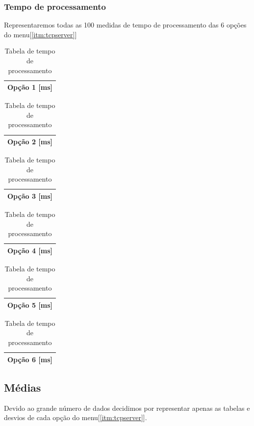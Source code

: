\documentclass[a4paper,10pt]{article}
\begin{document}
\subsubsection{Tempo de processamento}
Representaremos todas as 100 medidas de tempo de processamento das 6 opções do menu[\ref{itm:tcpserver}]
\begin{table}
\addtolength{\abovecaptionskip}{-2pt}
  \tiny
  \centering
  \begin{tabular}{|c|}
    \hline
    Opção 1 [ms] \\
    \hline
    
    \hline
  \end{tabular}
  \begin{tabular}{|c|}
    \hline
    Opção 2 [ms] \\
    \hline
    
    \hline
  \end{tabular}
  \begin{tabular}{|c|}
    \hline
    Opção 3 [ms] \\
    \hline
    
    \hline
  \end{tabular}
  \begin{tabular}{|c|}
    \hline
    Opção 4 [ms] \\
    \hline
    
    \hline
  \end{tabular}
  \begin{tabular}{|c|}
    \hline
    Opção 5 [ms] \\
    \hline
    
    \hline
  \end{tabular}
  \begin{tabular}{|c|}
    \hline
    Opção 6 [ms] \\
    \hline
    
    \hline
  \end{tabular}
  \caption{Tabela de tempo de processamento}
\end{table}
\newpage
\subsection{Médias}
Devido ao grande número de dados decidimos por representar apenas as tabelas
e desvios de cada opção do menu[\ref{itm:tcpserver}].\\
\end{document}
